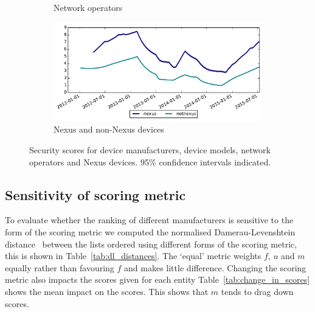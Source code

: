 \begin{figure}
\begin{subfigure}{\columnwidth}
\caption{Network operators}
\label{fig:security_score_operator}
\end{subfigure}
%
\begin{subfigure}{\columnwidth}
\includegraphics[width=\columnwidth]{figures/security_score_summary}
\caption{Nexus and non-Nexus devices}
\label{fig:security_score_summary}
\end{subfigure}
\caption{Security scores for device manufacturers, device models, network operators and Nexus devices. 95\% confidence intervals indicated.}
\label{fig:security_scores}
\end{figure}

\subsection{Sensitivity of scoring metric}
\daTabDLDistances
\daTabChangeInScores
To evaluate whether the ranking of different manufacturers is sensitive to the form of the scoring metric we computed the normalised Damerau-Levenshtein distance~\cite{Bard2007} between the lists ordered using different forms of the scoring metric, this is shown in Table~\ref{tab:dl_distances}.
The `equal' metric weights $f$, $u$ and $m$ equally rather than favouring $f$ and makes little difference.
Changing the scoring metric also impacts the scores given for each entity Table~\ref{tab:change_in_scores} shows the mean impact on the scores.
This shows that $m$ tends to drag down scores.

